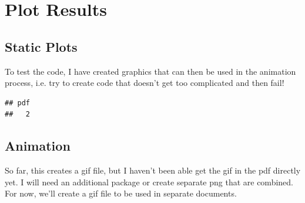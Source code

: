 \documentclass{article}\usepackage[]{graphicx}\usepackage[]{color}
\makeatletter
\newenvironment{kframe}{%
 \def\at@end@of@kframe{}%
 \ifinner\ifhmode%
  \def\at@end@of@kframe{\end{minipage}}%
  \begin{minipage}{\columnwidth}%
 \fi\fi%
 \def\FrameCommand##1{\hskip\@totalleftmargin \hskip-\fboxsep
 \colorbox{shadecolor}{##1}\hskip-\fboxsep
     \hskip-\linewidth \hskip-\@totalleftmargin \hskip\columnwidth}%
 \MakeFramed {\advance\hsize-\width
   \@totalleftmargin\z@ \linewidth\hsize
   \@setminipage}}%
 {\par\unskip\endMakeFramed%
 \at@end@of@kframe}
\newenvironment{knitrout}{}{} %
\makeatother
\begin{document}
\section{Plot Results}

\subsection{Static Plots}

To test the code, I have created graphics that can then be used in the animation process, i.e. try to create code that doesn't get too complicated and then fail! 

\begin{knitrout}
\color{fgcolor}\begin{kframe}


{\ttfamily\noindent\bfseries\color{errorcolor}{\#\# Error in `[.data.frame`(GSOM, GSOM\$Month == maxmonth \& GSOM\$Year <= i, : object 'maxmonth' not found}}\begin{verbatim}
## pdf 
##   2
\end{verbatim}
\end{kframe}
\end{knitrout}

\subsection{Animation}

So far, this creates a gif file, but I haven't been able get the gif in the pdf directly yet. I will need an additional package or create separate png that are combined. For now, we'll create a gif file to be used in separate documents.
\end{document}
